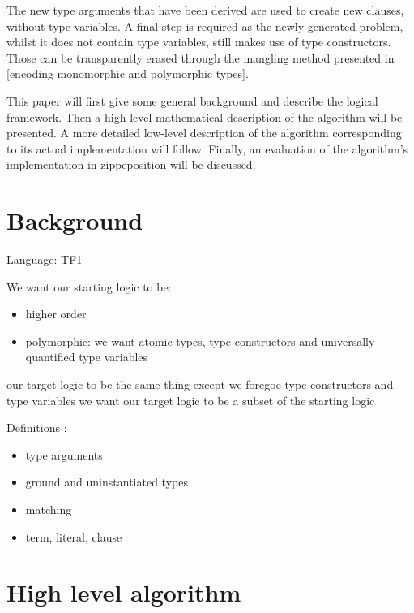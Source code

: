 \documentclass{article}
\begin{document}
The new type arguments that have been derived are used to create new clauses, without type variables.
    A final step is required as the newly generated problem, whilst it does not contain type variables, still makes use of type constructors. Those can be transparently erased through the mangling method presented in [encoding monomorphic and polymorphic types].


This paper will first give some general background and describe the logical framework. Then a high-level mathematical description of the algorithm will be presented. A more detailed low-level description of the algorithm corresponding to its actual implementation will follow.
       Finally, an evaluation of the algorithm's implementation in zippeposition will be discussed.

\section{Background}


Language: TF1  %

We want our starting logic to be:
\begin{itemize}
    \item higher order
    \item polymorphic: we want atomic types, type constructors and universally quantified type variables
\end{itemize}
our target logic to be the same thing except we foregoe type constructors and type variables 
we want our target logic to be a subset of the starting logic


Definitions :
\begin{itemize}
   \item type arguments %
   \item ground and uninstantiated types %
   \item matching %
   \item term, literal, clause  %
\end{itemize}

\section{High level algorithm}
\end{document}
